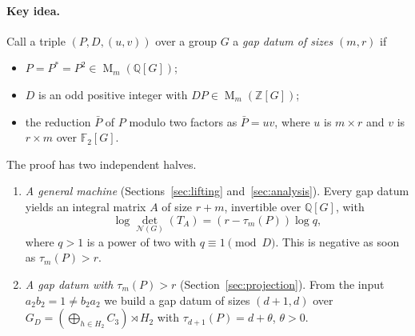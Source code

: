 \documentclass[11pt]{article}
\theoremstyle{remark}
\numberwithin{equation}{section}
\newcommand{\F}{\mathbb F}
\newcommand{\Z}{\mathbb Z}
\newcommand{\Q}{\mathbb Q}
\newcommand{\Mat}{\operatorname{M}}
\newcommand{\N}{\mathcal N}
\begin{document}
\paragraph{Key idea.}
Call a triple $(P,D,(u,v))$ over a group $G$ a \emph{gap datum of sizes $(m,r)$} if
\begin{itemize}[leftmargin=2em]
\item $P=P^*=P^2\in\Mat_m(\Q[G])$;
\item $D$ is an odd positive integer with $DP\in\Mat_m(\Z[G])$;
\item the reduction $\bar P$ of $P$ modulo two factors as $\bar P=uv$, where $u$ is $m\times r$ and $v$ is $r\times m$ over $\F_2[G]$.
\end{itemize}
The proof has two independent halves.
\begin{enumerate}[leftmargin=2em]
\item \emph{A general machine} (Sections~\ref{sec:lifting} and~\ref{sec:analysis}). Every gap datum yields an integral matrix $A$ of size $r+m$, invertible over $\Q[G]$, with
\[
 \log\det_{\N(G)}(T_A)=(r-\tau_m(P))\log q,
\]
where $q>1$ is a power of two with $q\equiv1\pmod D$. This is negative as soon as $\tau_m(P)>r$.
\item \emph{A gap datum with $\tau_m(P)>r$} (Section~\ref{sec:projection}). From the input $a_2b_2=1\ne b_2a_2$ we build a gap datum of sizes $(d+1,d)$ over $G_D=(\bigoplus_{h\in H_2}C_3)\rtimes H_2$ with $\tau_{d+1}(P)=d+\theta$, $\theta>0$.
\end{enumerate}
\end{document}
